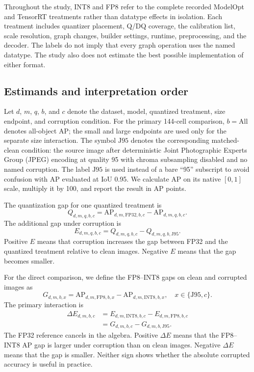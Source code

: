 \documentclass[a4paper,fleqn]{cas-dc}
\newcommand{\AP}{\mathrm{AP}}
\newcommand{\Jclean}{\mathrm{J95}}
\begin{document}
Throughout the study, INT8 and FP8 refer to the complete recorded ModelOpt and TensorRT treatments rather than datatype effects in isolation. Each treatment includes quantizer placement, Q/DQ coverage, the calibration list, scale resolution, graph changes, builder settings, runtime, preprocessing, and the decoder. The labels do not imply that every graph operation uses the named datatype. The study also does not estimate the best possible implementation of either format.

\subsection{Estimands and interpretation order}
\label{sec:estimands}

Let $d$, $m$, $q$, $b$, and $c$ denote the dataset, model, quantized treatment, size endpoint, and corruption condition. For the primary 144-cell comparison, $b=\mathrm{All}$ denotes all-object AP; the small and large endpoints are used only for the separate size interaction. The symbol $\Jclean$ denotes the corresponding matched-clean condition: the source image after deterministic Joint Photographic Experts Group (JPEG) encoding at quality 95 with chroma subsampling disabled and no named corruption. The label $\Jclean$ is used instead of a bare ``95'' subscript to avoid confusion with AP evaluated at IoU 0.95. We calculate AP on its native $[0,1]$ scale, multiply it by 100, and report the result in AP points.

The quantization gap for one quantized treatment is
\begin{equation}
Q_{d,m,q,b,c}=\AP_{d,m,\mathrm{FP32},b,c}-\AP_{d,m,q,b,c}.
\label{eq:q}
\end{equation}
The additional gap under corruption is
\begin{equation}
E_{d,m,q,b,c}=Q_{d,m,q,b,c}-Q_{d,m,q,b,\Jclean}.
\label{eq:e}
\end{equation}
Positive $E$ means that corruption increases the gap between FP32 and the quantized treatment relative to clean images. Negative $E$ means that the gap becomes smaller.

For the direct comparison, we define the FP8--INT8 gaps on clean and corrupted images as
\begin{equation}
G_{d,m,b,x}=\AP_{d,m,\mathrm{FP8},b,x}-
             \AP_{d,m,\mathrm{INT8},b,x},\quad x\in\{\Jclean,c\}.
\end{equation}
The primary interaction is
\begin{align}
\Delta E_{d,m,b,c}
&=E_{d,m,\mathrm{INT8},b,c}-E_{d,m,\mathrm{FP8},b,c}\nonumber\\
&=G_{d,m,b,c}-G_{d,m,b,\Jclean}.
\label{eq:delta-e}
\end{align}
The FP32 reference cancels in the algebra. Positive $\Delta E$ means that the FP8--INT8 AP gap is larger under corruption than on clean images. Negative $\Delta E$ means that the gap is smaller. Neither sign shows whether the absolute corrupted accuracy is useful in practice.
\end{document}
